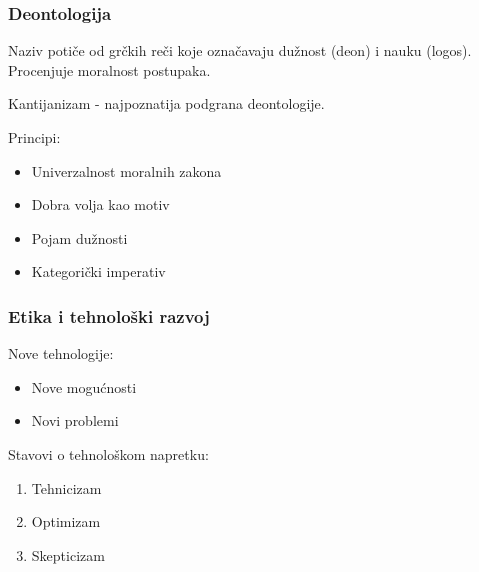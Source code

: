 \documentclass[pdf]{beamer}
\begin{document}
\begin{frame}
\frametitle{Deontologija}

Naziv potiče od grčkih reči koje označavaju dužnost (deon) i nauku (logos). Procenjuje moralnost postupaka.


Kantijanizam - najpoznatija podgrana deontologije.

Principi:
\begin{itemize}
\item{Univerzalnost moralnih zakona}
\item{Dobra volja kao motiv}
\item{Pojam dužnosti} %
\item{Kategorički imperativ}
\end{itemize}

\end{frame}


\begin{frame}
\frametitle{Etika i tehnološki razvoj}

	Nove tehnologije:

	\begin{itemize}

	\item Nove mogućnosti

	\item Novi problemi

	\end{itemize}

	Stavovi o tehnološkom napretku:

	\begin{enumerate}

	\item Tehnicizam %
	\item Optimizam
	\item Skepticizam

	\end{enumerate}

	\end{frame}
\end{document}
